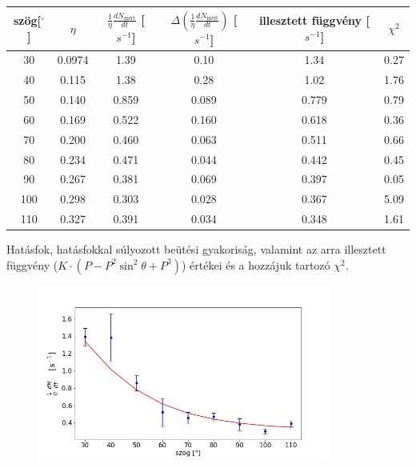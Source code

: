 \documentclass[a4paper,12pt]{article}
\begin{document}
\begin{table}[h]
\begin{center}
\begin{tabular}{|c|c|c|c|c|c|}
\hline
szög[$^{\circ}$] &  $\eta$ & $\frac{1}{\eta}\frac{dN_{\text{mért}}}{dt}$ [$s^{-1}$] & $\Delta\left(\frac{
1}{\eta}\frac{dN_{\text{mért}}}{dt}\right)$ [$s^{-1}$] & illesztett függvény [$s^{-1}$]& $\chi^{2}$ \\
\hline
30 & 0.0974 & 1.39 & 0.10 & 1.34 & 0.27 \\
\hline
40 & 0.115 & 1.38 & 0.28 & 1.02 & 1.76 \\
\hline
50 & 0.140 & 0.859 & 0.089 & 0.779 & 0.79 \\
\hline
60 & 0.169 & 0.522 & 0.160 & 0.618 & 0.36 \\
\hline
70 & 0.200 & 0.460 & 0.063 & 0.511 & 0.66 \\
\hline
80 & 0.234 & 0.471 & 0.044 & 0.442 & 0.45 \\
\hline
90 & 0.267 & 0.381 & 0.069 & 0.397 & 0.05 \\
\hline
100 & 0.298 & 0.303 & 0.028 & 0.367 & 5.09 \\
\hline
110 & 0.327 & 0.391 & 0.034 & 0.348 & 1.61 \\
\hline
\end{tabular}
\end{center}
\end{table}

\par Hatásfok, hatásfokkal súlyozott beütési gyakoriság, valamint az arra illesztett függvény ($K\cdot (P-P^2\sin^2{\theta}+P^3)$) értékei és a hozzájuk tartozó $\chi^2$.

\begin{figure}[!htb]
\centering
\includegraphics[width=0.86\textwidth]{../notebook/klein-nishina.png}
\end{figure}
\end{document}
